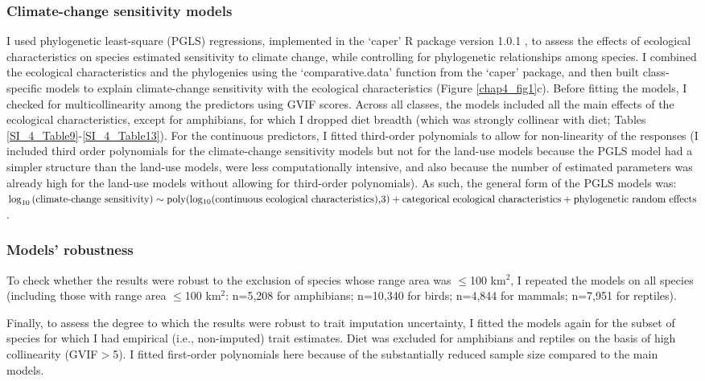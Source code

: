 \subsubsection{Climate-change sensitivity models}
I used phylogenetic least-square (PGLS) regressions, implemented in the `caper' R package version 1.0.1 \citep{caper}, to assess the effects of ecological characteristics on species estimated sensitivity to climate change, while controlling for phylogenetic relationships among species. I combined the ecological characteristics and the phylogenies using the `comparative.data' function from the `caper' package, and then built class-specific models to explain climate-change sensitivity with the ecological characteristics (Figure \ref{chap4_fig1}c). Before fitting the models, I checked for multicollinearity among the predictors using GVIF scores. Across all classes, the models included all the main effects of the ecological characteristics, except for amphibians, for which I dropped diet breadth (which was strongly collinear with diet; Tables \ref{SI_4_Table9}-\ref{SI_4_Table13}). For the continuous predictors, I fitted third-order polynomials to allow for non-linearity of the responses (I included third order polynomials for the climate-change sensitivity models but not for the land-use models because the PGLS model had a simpler structure than the land-use models, were less computationally intensive, and also because the number of estimated parameters was already high for the land-use models without allowing for third-order polynomials). As such, the general form of the PGLS models was: \\
\vspace{0.3cm}
$\log_{10}\text{(climate-change sensitivity)}  \sim  \text{poly(log\textsubscript{10}(continuous ecological characteristics),3)} +\\
\text{categorical ecological characteristics} + 
\text{phylogenetic random effects}$.


\subsubsection{Models' robustness}
To check whether the results were robust to the exclusion of species whose range area was $\leq$100 km$^2$, I repeated the models on all species (including those with range area $\leq$100 km$^2$: n=5,208 for amphibians; n=10,340 for birds; n=4,844 for mammals; n=7,951 for reptiles). 

Finally, to assess the degree to which the results were robust to trait imputation uncertainty, I fitted the models again for the subset of species for which I had empirical (i.e., non-imputed) trait estimates. Diet was excluded for amphibians and reptiles on the basis of high collinearity (GVIF$>$5). I fitted first-order polynomials here because of the substantially reduced sample size compared to the main models.




